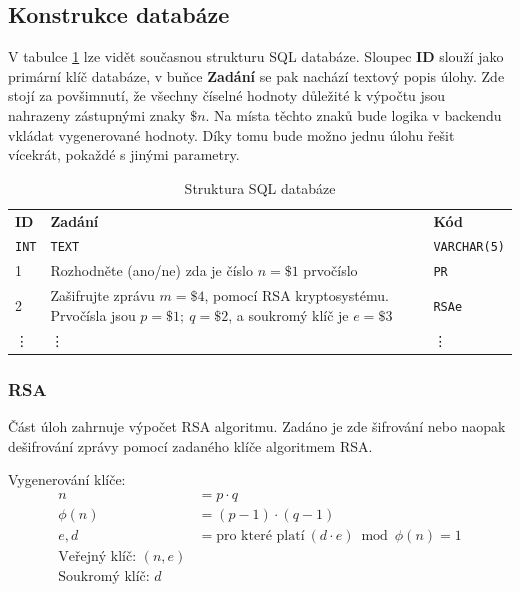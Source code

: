 \documentclass[titlepage]{article}
\begin{document}
\subsection{Konstrukce databáze}
V tabulce \ref{tab:struktura_databaze} lze vidět současnou strukturu SQL databáze. Sloupec \textbf{ID} slouží jako primární klíč databáze, v buňce \textbf{Zadání} se pak nachází textový popis úlohy. Zde stojí za povšimnutí, že všechny číselné hodnoty důležité k výpočtu jsou nahrazeny zástupnými znaky $\$n$. Na místa těchto znaků bude logika v backendu vkládat vygenerované hodnoty. Díky tomu bude možno jednu úlohu řešit vícekrát, pokaždé s jinými parametry.  
 \begin{table}
    \centering
    \caption{Struktura SQL databáze}
    \label{tab:struktura_databaze}
    \vspace{.5em}
    \begin{tabular}[h]{| l | p{7cm} | l | }
        \hline
        \textbf{ID} & \textbf{Zadání} & \textbf{Kód} \\
        \texttt{INT} & \texttt{TEXT} & \texttt{VARCHAR(5)} \\
        \hline\hline
        1 & Rozhodněte (ano/ne) zda je číslo $n=\$1$ prvočíslo & \texttt{PR} \\
        \hline
        2 & Zašifrujte zprávu $m=\$4$, pomocí RSA kryptosystému. Prvočísla jsou $p=\$1;\ q=\$2$, a soukromý klíč je $e=\$3$ & \texttt{RSAe} \\
        \hline
        \vdots & \vdots & \vdots \\
        \hline
    \end{tabular}
 \end{table}
    


\subsubsection{RSA}
Část  úloh zahrnuje výpočet RSA algoritmu. Zadáno je zde šifrování nebo naopak dešifrování zprávy pomocí zadaného klíče algoritmem RSA.

Vygenerování klíče: 
\begin{align*}
     n &= p \cdot q \\
    \phi(n) &= (p-1) \cdot (q-1) \\
    e, d &= \text{pro které platí}\ (d \cdot e) \bmod \phi(n) = 1 \\
    \text{Veřejný klíč: } (n, e) \\
    \text{Soukromý klíč: } d
\end{align*}
\end{document}
